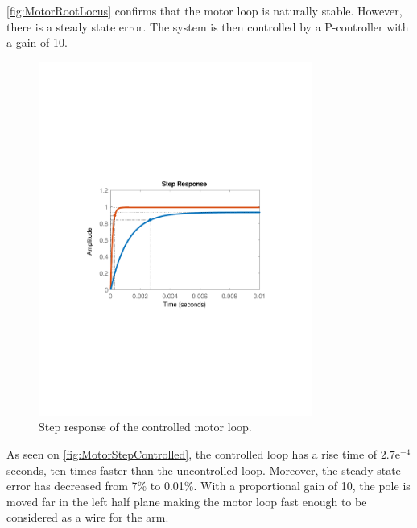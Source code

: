 \autoref{fig:MotorRootLocus} confirms that the motor loop is naturally stable. However, there is a steady state error. The system is then controlled by a P-controller with a gain of 10. 
\begin{figure} [htbp]
	\centering
	\includegraphics[width=0.8\textwidth]{figures/Design/MotorLoop/MotorStepControlled}
	\caption{Step response of the controlled motor loop.}
	\label{fig:MotorStepControlled}
\end{figure}

As seen on \autoref{fig:MotorStepControlled}, the controlled loop has a rise time of $2.7\text{e}^{-4}$ seconds, ten times faster than the uncontrolled loop. Moreover, the steady state error has decreased from 7\% to 0.01\%. With a proportional gain of 10, the pole is moved far in the left half plane making the motor loop fast enough to be considered as a wire for the arm.

